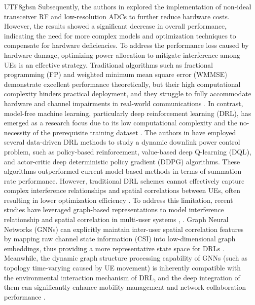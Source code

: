 \documentclass[lettersize,journal]{IEEEtran}
\begin{document}
\begin{CJK}{UTF8}{gbsn}
Subsequently, the authors in \cite{paperIA15} explored the implementation of non-ideal transceiver RF and low-resolution ADCs to further reduce hardware costs. However, the results showed a significant decrease in overall performance, indicating the need for more complex models and optimization techniques to compensate for hardware deficiencies. To address the performance loss caused by hardware damage, optimizing power allocation to mitigate interference among UEs is an effective strategy. Traditional algorithms such as fractional programming (FP) and weighted minimum mean square error (WMMSE) demonstrate excellent performance theoretically, but their high computational complexity hinders practical deployment, and they struggle to fully accommodate hardware and channel impairments in real-world communications \cite{paperIA17}. In contrast, model-free machine learning, particularly deep reinforcement learning (DRL), has emerged as a research focus due to its low computational complexity and the no-necessity of the prerequisite training dataset \cite{paperIA16}. The authors in \cite{paperIA17} have employed several data-driven DRL methods to study a dynamic downlink power control problem, such as policy-based reinforcement, value-based deep Q-learning (DQL), and actor-critic deep deterministic policy gradient (DDPG) algorithms. These algorithms outperformed current model-based methods in terms of summation rate performance. However, traditional DRL schemes cannot effectively capture complex interference relationships and spatial correlations between UEs, often resulting in lower optimization efficiency \cite{paper10}. To address this limitation, recent studies have leveraged graph-based representations to model interference relationship and spatial correlation in multi-user systems \cite{paperIB3}, \cite{paperIB4}. Graph Neural Networks (GNNs) can explicitly maintain inter-user spatial correlation features by mapping raw channel state information (CSI) into low-dimensional graph embeddings, thus providing a more representative state space for DRLs \cite{paperIB3}. Meanwhile, the dynamic graph structure processing capability of GNNs (such as topology time-varying caused by UE movement) is inherently compatible with the environmental interaction mechanism of DRL, and the deep integration of them can significantly enhance mobility management and network collaboration performance \cite{paperIB4}.

\end{CJK}
\end{document}
